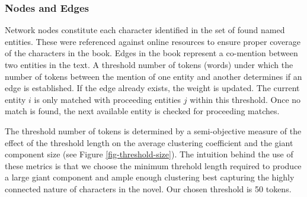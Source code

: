 \subsubsection{Nodes and Edges}
Network nodes constitute each character identified in the set of found named entities. These were referenced against online resources to ensure proper coverage of the characters in the book. Edges in the book represent a co-mention between two entities in the text. A threshold number of tokens (words) under which the number of tokens between the mention of one entity and another determines if an edge is established. If the edge already exists, the weight is updated. The current entity $i$ is only matched with proceeding entities $j$ within this threshold. Once no match is found, the next available entity is checked for proceeding matches.

The threshold number of tokens is determined by a semi-objective measure of the effect of the threshold length on the average clustering coefficient and the giant component size (see Figure \ref{fig-threshold-size}). The intuition behind the use of these metrics is that we choose the minimum threhold length required to produce a large giant component and ample enough clustering best capturing the highly connected nature of characters in the novel. Our chosen threshold is 50 tokens.

